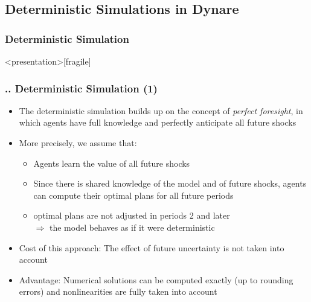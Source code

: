 \documentclass[11pt,aspectratio=169]{beamer}
\begin{document}
\subsection{Deterministic Simulations in Dynare}
\subsubsection{Deterministic Simulation}
\begin{frame}<presentation>[fragile]
	\frametitle{{\thesection.\thesubsection.\thesubsubsection} Deterministic Simulation (1)}
	\begin{itemize}
		\item The deterministic simulation builds up on the concept of \textit{perfect foresight}, in which agents have full knowledge and perfectly anticipate all future shocks
		\item More precisely, we assume that:
		\begin{itemize}
			\item Agents learn the value of all future shocks
			\item Since there is shared knowledge of the model and of future shocks, agents can compute their optimal plans for all future periods
			\item optimal plans are not adjusted in periods 2 and later\\ $\Rightarrow$ the model behaves as if it were deterministic
		\end{itemize}
		\item Cost of this approach: The effect of future uncertainty is not taken into account
		\item Advantage: Numerical solutions can be computed exactly (up to rounding errors) and nonlinearities are fully taken into account
	\end{itemize}
\end{frame}
\end{document}
